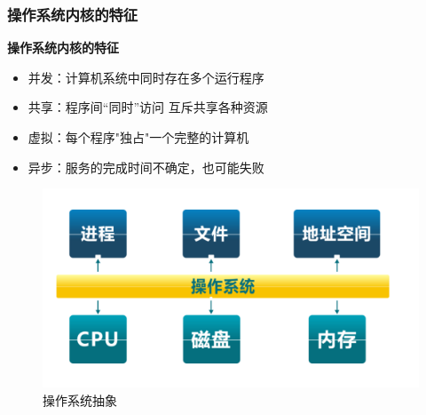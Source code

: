 \documentclass[UTF8]{ctexbeamer}
\begin{document}
\begin{frame}
	\frametitle{操作系统内核的特征}
	\textbf{操作系统内核的特征}
	\begin{itemize}
		\item 并发：计算机系统中同时存在多个运行程序
		\item 共享：程序间“同时”访问 互斥共享各种资源
		\item 虚拟：每个程序"独占"一个完整的计算机
		\item 异步：服务的完成时间不确定，也可能失败
	\end{itemize}
	\begin{figure}
	\centering
	\includegraphics[width=0.6\linewidth]{os-abstract}
	\caption{操作系统抽象}
\end{figure}
\end{frame}
\end{document}
